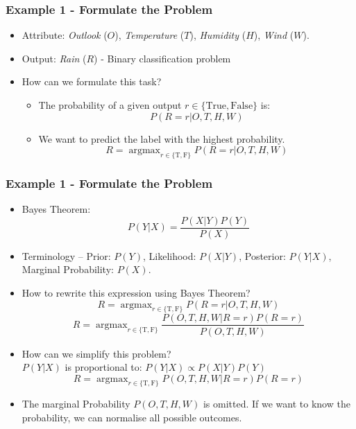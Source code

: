 \documentclass[aspectratio=169, 10pt]{beamer}
\DeclareMathOperator*{\argmax}{argmax}
\begin{document}
\begin{frame}[t]
\frametitle{Example 1 - Formulate the Problem}
    \begin{itemize}
        \item Attribute: \textit{Outlook} ($O$), \textit{Temperature} ($T$), \textit{Humidity} ($H$), \textit{Wind} ($W$).
        \item Output: \textit{Rain} ($R$) - Binary classification problem
        \item How can we formulate this task?
        \pause
            \begin{itemize}
                \item The probability of a given output $r \in \{\text{True}, \text{False}\}$ is:
                    $$P(R=r| O,T,H,W)$$
                \pause
                \item We want to predict the label with the highest probability.
                    $$R = \argmax_{r \in \{\text{T}, \text{F}\}} P(R=r| O,T,H,W)$$
            \end{itemize}
    \end{itemize}
\end{frame}

\begin{frame}[t]
    \frametitle{Example 1 - Formulate the Problem}
        \begin{itemize}
            \item Bayes Theorem: 
            \[ P(Y|X) = \frac{P(X|Y) P(Y)}{P(X)} \]
            \item Terminology -- Prior: $P(Y)$, Likelihood: $P(X|Y)$, Posterior: $P(Y|X)$, Marginal Probability: $P(X)$.
            \item How to rewrite this expression using Bayes Theorem?
            \pause
            \[ R = \argmax_{r \in \{\text{T}, \text{F}\}} P(R=r| O,T,H,W) \]
            \[ R = \argmax_{r \in \{\text{T}, \text{F}\}} \frac{P(O,T,H,W| R=r) P(R=r)}{P(O,T,H,W)} \]
            \item How can we simplify this problem?
            \pause
            \\ $P(Y|X)$ is proportional to: $P(Y|X) \propto P(X|Y) P(Y)$
            \[ R = \argmax_{r \in \{\text{T}, \text{F}\}} P(O,T,H,W| R=r) P(R=r) \]
            \item The marginal Probability $P(O,T,H,W)$ is omitted. If we want to know the probability, we can normalise all possible outcomes.
        \end{itemize}
    \end{frame}
\end{document}
